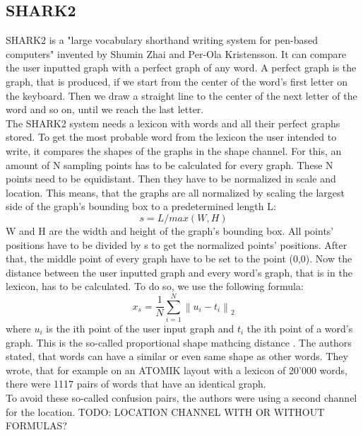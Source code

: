 \subsection{SHARK2}
SHARK2 is a "large vocabulary shorthand writing system for pen-based computers" \cite{Kristensson2004SHARK2AL} invented by Shumin Zhai and Per-Ola Kristensson. It can compare the user inputted graph with a perfect graph of any word. A perfect graph is the graph, that is produced, if we start from the center of the word's first letter on the keyboard. Then we draw a straight line to the center of the next letter of the word and so on, until we reach the last letter.\\
The SHARK2 system needs a lexicon with words and all their perfect graphs stored. To get the most probable word from the lexicon the user intended to write, it compares the shapes of the graphs in the shape channel. For this, an amount of N sampling points has to be calculated for every graph. These N points need to be equidistant. Then they have to be normalized in scale and location. This means, that the graphs are all normalized by scaling the largest side of the graph's bounding box to a predetermined length L: 
\begin{equation}
    s = L / max(W,H)
\end{equation}
W and H are the width and height of the graph's bounding box. All points' positions have to be divided by s to get the normalized points' positions. After that, the middle point of every graph have to be set to the point (0,0). Now the distance between the user inputted graph and every word's graph, that is in the lexicon, has to be calculated. To do so, we use the following formula:
\begin{equation}
    x_s = \frac{1}{N}\sum_{i = 1}^{N}\left\lVert u_i - t_i\right\rVert_2
\end{equation}
where $u_i$ is the ith point of the user input graph and $t_i$ the ith point of a word's graph. This is the so-called proportional shape mathcing distance \cite{Kristensson2004SHARK2AL}. The authors stated, that words can have a similar or even same shape as other words. They wrote, that for example on an ATOMIK layout with a lexicon of 20'000 words, there were 1117 pairs of words that have an identical graph.\\
To avoid these so-called confusion pairs, the authors were using a second channel for the location. TODO: LOCATION CHANNEL WITH OR WITHOUT FORMULAS?\\

